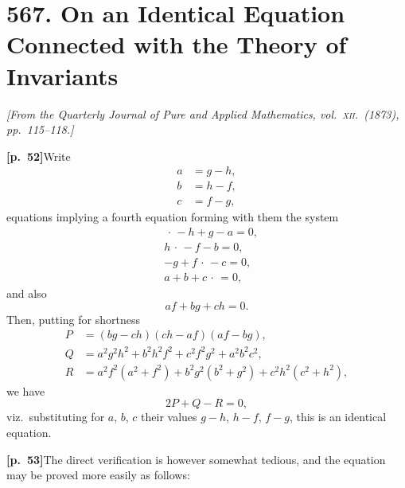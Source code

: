 \documentclass[11pt,a4paper]{article}
\begin{document}
\bigskip

\section*{\textbf{567.} On an Identical Equation Connected with the Theory of Invariants}

\noindent\textit{[From the Quarterly Journal of Pure and Applied Mathematics, vol.\ \textsc{xii}.\ (1873), pp.~115--118.]}

\bigskip

\noindent\textbf{[p.~52]}\quad Write
\begin{align*}
a &= g - h, \\
b &= h - f, \\
c &= f - g,
\end{align*}
equations implying a fourth equation forming with them the system
\begin{align*}
&\,\cdot\, - h + g - a = 0, \\
& h\,\cdot\, - f - b = 0, \\
& -g + f\,\cdot\, - c = 0, \\
& a + b + c\,\cdot\, = 0,
\end{align*}
and also
\[
af + bg + ch = 0.
\]
Then, putting for shortness
\begin{align*}
P &= (bg - ch)(ch - af)(af - bg), \\
Q &= a^{2}g^{2}h^{2} + b^{2}h^{2}f^{2} + c^{2}f^{2}g^{2} + a^{2}b^{2}c^{2}, \\
R &= a^{2}f^{2}(a^{2} + f^{2}) + b^{2}g^{2}(b^{2} + g^{2}) + c^{2}h^{2}(c^{2} + h^{2}),
\end{align*}
we have
\[
2P + Q - R = 0,
\]
viz.\ substituting for $a$, $b$, $c$ their values $g - h$, $h - f$, $f - g$, this is an identical equation.

\bigskip

\noindent\textbf{[p.~53]}\quad The direct verification is however somewhat tedious, and the equation may be proved more easily as follows:
\end{document}
